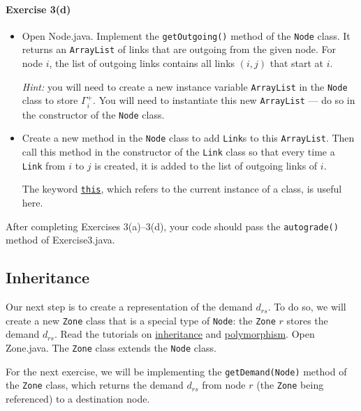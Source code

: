 \documentclass[11pt]{article}
\begin{document}
\paragraph*{Exercise 3(d)} 
\begin{itemize}
	\item Open Node.java. Implement the \texttt{getOutgoing()} method of the \texttt{Node} class.
	It returns an \texttt{ArrayList} of links that are outgoing from the given node. For node $i$, the list of outgoing links contains all links $(i, j)$ that start at $i$.
	
	 \textit{Hint:} you will need to create a new instance variable \texttt{ArrayList} in the \texttt{Node} class to store $\Gamma^+_i$. You will need to instantiate this new \texttt{ArrayList} --- do so in the constructor of the \texttt{Node} class.
	 
	 \item Create a new method in the \texttt{Node} class to add \texttt{Link}s to this \texttt{ArrayList}. Then call this method in the constructor of the \texttt{Link} class so that every time a \texttt{Link} from $i$ to $j$ is created, it is added to the list of outgoing links of $i$.
	 
	 The keyword \href{https://www.w3schools.com/java/ref_keyword_this.asp}{\texttt{this}}, which refers to the current instance of a class, is useful here. 
\end{itemize}


After completing Exercises 3(a)--3(d), your code should pass the \texttt{autograde()} method of Exercise3.java. 




\subsection{Inheritance}
\label{sec32}

Our next step is to create a representation of the demand $d_{rs}$. To do so, we will create a new \texttt{Zone} class that is a special type of \texttt{Node}: the \texttt{Zone} $r$ stores the demand $d_{rs}$. Read the tutorials on \href{https://www.w3schools.com/java/java_inheritance.asp}{inheritance} and \href{https://www.w3schools.com/java/java_polymorphism.asp}{polymorphism}. Open Zone.java. 
The \texttt{Zone} class extends the \texttt{Node} class. 


For the next exercise, we will be implementing the \texttt{getDemand(Node)} method of the \texttt{Zone} class, which returns the demand $d_{rs}$ from node $r$ (the \texttt{Zone} being referenced) to a destination node. 
\end{document}
